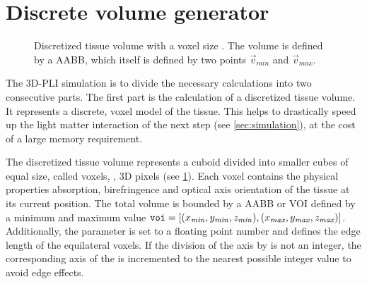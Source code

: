 \section{Discrete volume generator}
\label{sec:dv_generator}
%
\begin{figure}[!t]
\centering
\setlength{\tikzwidth}{0.5\textwidth}
\caption{Discretized tissue volume with a voxel size \voxelsize. The volume is defined by a \ac{AABB}, which itself is defined by two points $\vec{v}_\mathit{min}$ and $\vec{v}_\mathit{max}$.}
\label{fig:discVol}
\end{figure}
%
The \ac{3D-PLI} simulation is to divide the necessary calculations into two consecutive parts. The first part is the calculation of a discretized tissue volume.
It represents a discrete, voxel model of the tissue.
This helps to drastically speed up the light matter interaction of the next step (see \cref{sec:simulation}), at the cost of a large memory requirement.
\par
%
The discretized tissue volume represents a cuboid divided into smaller cubes of equal size, called voxels, \ie{}, 3D pixels (see \cref{fig:discVol}).
Each voxel contains the physical properties absorption, birefringence and optical axis orientation of the tissue at its current position.
The total volume is bounded by a \ac{AABB} or \ac{VOI} defined by a minimum and maximum value $\texttt{voi} = [(x_{\mathit{min}}, y_{\mathit{min}}, z_{\mathit{min}}), (x_{\mathit{max}}, y_{\mathit{max}}, z_{\mathit{max}})]$.
Additionally, the parameter \Voxelsize{} \voxelsize{} is set to a floating point number and defines the edge length of the equilateral voxels.
If the division of the \voi{} axis by \voxelsize{} is not an integer, the corresponding axis of the \voi{} is incremented to the nearest possible integer value to avoid edge effects.
%
%
%
